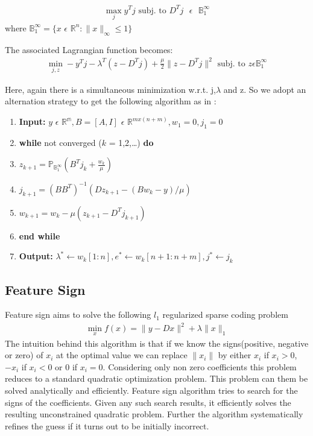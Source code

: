\documentclass{article} %
\begin{document}
\begin{align}
\max\limits_j y^Tj\text{ subj. to }D^Tj \text{ } \epsilon \text{ } \mathbb{B}_1^\infty
\end{align}
where $\mathbb{B}_1^\infty = \{x$ $\epsilon$ $\mathbb{R}^n : \|x\|_\infty \leq 1\}$

The associated Lagrangian function becomes:
\begin{align}
\min\limits_{j,z} -y^Tj - \lambda^T(z-D^Tj) + \frac{\mu}{2}\|z-D^Tj\|^2
\text{ subj. to }z \epsilon\mathbb{B}_1^\infty
\end{align} 

Here, again there is a simultaneous minimization w.r.t. j,$\lambda$ and z. So we adopt an alternation strategy to get the following algorithm as in \citep{yang2010fast}:

\begin{enumerate}
\item \textbf{Input:} $y$ $\epsilon$ $\mathbb{R^m}, B = [A,I]$ $\epsilon$ $\mathbb{R}^{mx(n+m)}, w_1 = 0, j_1 = 0$
\item \textbf{while} not converged ($k$ = 1,2,\ldots) \textbf{do}
\item \hspace{.4cm} $z_{k+1} = \mathbb{P}_{\mathbb{B}_1^\infty}(B^Tj_k + \frac{w_k}{\mu})$
\item \hspace{.4cm} $j_{k+1} = (BB^T)^{-1}(Dz_{k+1} - (Bw_k - y)/\mu)$
\item \hspace{.4cm} $w_{k+1} = w_k - \mu(z_{k+1} - D^Tj_{k+1})$
\item \textbf{end while}
\item \textbf{Output: }$\lambda^{*} \leftarrow w_k[1:n], e^{*} \leftarrow w_k[n+1:n+m], j^{*} \leftarrow j_k$
\end{enumerate}

\subsection{Feature Sign}
Feature sign \cite{lee2007efficient} aims to solve the following $l_1$ regularized sparse coding problem
\begin{align}
\min_x f(x) = \|y - Dx\|^2 + \lambda\|x\|_1
\end{align}
The intuition behind this algorithm is that if we know the signs(positive, negative or zero) of $x_i$ at the optimal value we can replace $\|x_i\|$ by either $x_i$ if $x_i > 0$, $-x_i$ if $x_i < 0$ or 0 if $x_i = 0$. Considering only non zero coefficients this problem reduces to a standard quadratic optimization problem. This problem can them be solved analytically and efficiently. Feature sign algorithm tries to search for the signs of the coefficients. Given any such search results, it efficiently solves the resulting unconstrained quadratic problem. Further the algorithm systematically refines the guess if it turns out to be initially incorrect.
\end{document}
